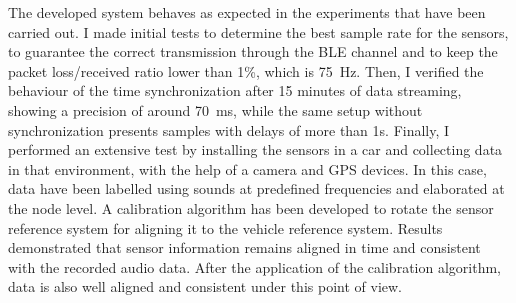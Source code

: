 The developed system behaves as expected in the experiments that have been carried out. 
I made initial tests to determine the best sample rate for the sensors, to guarantee the correct transmission through the BLE channel and to keep the packet loss/received ratio lower than 1\%, which is 75~Hz. 
Then, I verified the behaviour of the time synchronization after 15 minutes of data streaming, showing a precision of around 70~ms, while the same setup without synchronization presents samples with delays of more than 1s. 
Finally, I performed an extensive test by installing the sensors in a car and collecting data in that environment, with the help of a camera and GPS devices. 
In this case, data have been labelled using sounds at predefined frequencies and elaborated at the node level. A calibration algorithm has been developed to rotate the sensor reference system for aligning it to the vehicle reference system.
Results demonstrated that sensor information remains aligned in time and consistent with the recorded audio data. After the application of the calibration algorithm, data is also well aligned and consistent under this point of view.
